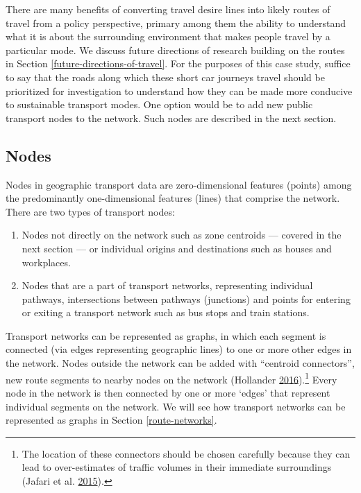 \documentclass[]{krantz}
\providecommand{\tightlist}{%
  \setlength{\itemsep}{0pt}\setlength{\parskip}{0pt}}
\let\rmarkdownfootnote\footnote%
\def\footnote{\protect\rmarkdownfootnote}
\begin{document}
There are many benefits of converting travel desire lines into likely routes of travel from a policy perspective, primary among them the ability to understand what it is about the surrounding environment that makes people travel by a particular mode.
We discuss future directions of research building on the routes in Section \ref{future-directions-of-travel}.
For the purposes of this case study, suffice to say that the roads along which these short car journeys travel should be prioritized for investigation to understand how they can be made more conducive to sustainable transport modes.
One option would be to add new public transport nodes to the network.
Such nodes are described in the next section.

\hypertarget{nodes}{%
\subsection{Nodes}\label{nodes}}

Nodes in geographic transport data are zero-dimensional features (points) among the predominantly one-dimensional features (lines) that comprise the network.
There are two types of transport nodes:

\begin{enumerate}
\def\labelenumi{\arabic{enumi}.}
\tightlist
\item
  Nodes not directly on the network such as zone centroids --- covered in the next section --- or individual origins and destinations such as houses and workplaces.
\item
  Nodes that are a part of transport networks, representing individual pathways, intersections between pathways (junctions) and points for entering or exiting a transport network such as bus stops and train stations.
\end{enumerate}

Transport networks can be represented as graphs, in which each segment is connected (via edges representing geographic lines) to one or more other edges in the network.
Nodes outside the network can be added with ``centroid connectors'', new route segments to nearby nodes on the network (Hollander \protect\hyperlink{ref-hollander_transport_2016}{2016}).\footnote{The location of these connectors should be chosen carefully because they can lead to over-estimates of traffic volumes in their immediate surroundings (Jafari et al. \protect\hyperlink{ref-jafari_investigation_2015}{2015}).}
Every node in the network is then connected by one or more `edges' that represent individual segments on the network.
We will see how transport networks can be represented as graphs in Section \ref{route-networks}.
\end{document}
